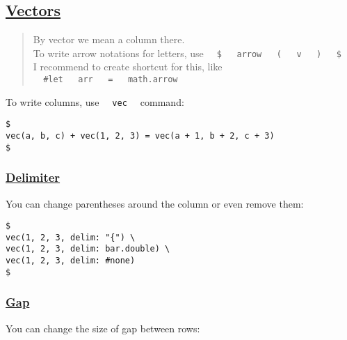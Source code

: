 \subsection{\texorpdfstring{\hyperref[vectors]{Vectors}}{Vectors}}\label{vectors}

\begin{quote}
By vector we mean a column there.\\
To write arrow notations for letters, use
\texttt{\ }{\texttt{\ \$\ }}\texttt{\ }{\texttt{\ arrow\ }}\texttt{\ }{\texttt{\ (\ }}\texttt{\ }{\texttt{\ v\ }}\texttt{\ }{\texttt{\ )\ }}\texttt{\ }{\texttt{\ \$\ }}\texttt{\ }\\
I recommend to create shortcut for this, like
\texttt{\ }{\texttt{\ \#let\ }}\texttt{\ }{\texttt{\ arr\ }}\texttt{\ }{\texttt{\ =\ }}\texttt{\ }{\texttt{\ math.arrow\ }}\texttt{\ }
\end{quote}

To write columns, use \texttt{\ }{\texttt{\ vec\ }}\texttt{\ } command:

\begin{verbatim}
$
vec(a, b, c) + vec(1, 2, 3) = vec(a + 1, b + 2, c + 3)
$
\end{verbatim}

\pandocbounded{}

\subsubsection{\texorpdfstring{\hyperref[delimiter]{Delimiter}}{Delimiter}}\label{delimiter}

You can change parentheses around the column or even remove them:

\begin{verbatim}
$
vec(1, 2, 3, delim: "{") \
vec(1, 2, 3, delim: bar.double) \
vec(1, 2, 3, delim: #none)
$
\end{verbatim}

\pandocbounded{}

\subsubsection{\texorpdfstring{\hyperref[gap]{Gap}}{Gap}}\label{gap}

You can change the size of gap between rows:

